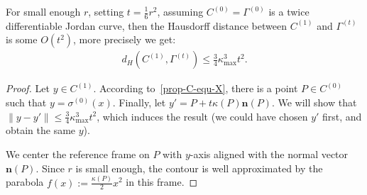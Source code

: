 \documentclass[review]{siamart220329}
\begin{document}
\begin{proposition}\label{prop:bcf-close-to-csf}
  For small enough $r$, setting $t = \frac{1}{6}r^2$, assuming $C^{(0)}=\Gamma^{(0)}$ is a twice differentiable Jordan curve, then the Hausdorff distance between
  $C^{(1)}$ and $\Gamma^{(t)}$ is some $O(t^2)$, more precisely we get:
  \begin{align*}
    d_H( C^{(1)}, \Gamma^{(t)} ) \le \frac{3}{4} \kappa_{\max}^3 t^2.
  \end{align*}
\end{proposition}
\begin{proof}
  Let $y \in C^{(1)}$. According to~\cref{prop-C-equ-X},
  there is a point $P \in C^{(0)}$ such that
  $y=\sigma^{(0)}(x)$. Finally, let $y'=P+t\kappa(P)\mathbf{n}(P)$. We
  will show that $\| y-y' \| \le \frac{3}{4} \kappa_{\max}^3 t^2$,
  which induces the result (we could have chosen $y'$ first, and
  obtain the same $y$).

  We center the reference frame on $P$ with $y$-axis aligned with the
  normal vector $\mathbf{n}(P)$.  Since $r$ is small enough, the
  contour is well approximated by the parabola $f(x) :=
  \frac{\kappa(P)}{2}x^2$ in this frame.


\end{proof}
\end{document}
